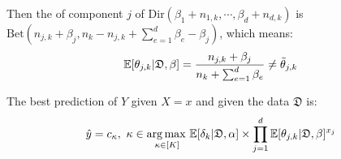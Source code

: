 Then the  of component $j$ of $\text{Dir}(\beta_1+n_{1,k},\cdots,\beta_d+n_{d,k})$ is $\text{Bet}(n_{j,k}+\beta_j, n_k-n_{j,k}+\sum_{e=1}^d\beta_e-\beta_j)$, which means:
\begin{equation*}
    \operatorname{\mathbb{E}} [\theta_{j,k}|\mathfrak{D},\beta] = \frac{n_{j,k}+\beta_j}{n_k+\sum_{e=1}^d\beta_e} \neq \Tilde{\theta}_{j,k}
\end{equation*}

The best prediction of $Y$ given $X=x$ and given the data $\mathfrak{D}$ is:
\begin{equation*}
    \hat{y} = c_{\kappa},\ \kappa \in \operatorname*{arg\,max\,}_{\kappa\in [K]} \operatorname{\mathbb{E}} [\delta_k|\mathfrak{D},\alpha]\times\prod_{j=1}^d \operatorname{\mathbb{E}} [\theta_{j,k}|\mathfrak{D},\beta]^{x_j}
\end{equation*}